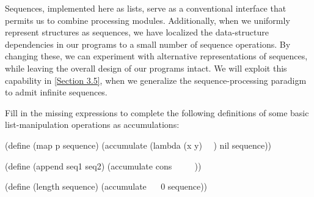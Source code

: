 Sequences, implemented here as lists, serve as a conventional interface that permits us to combine processing modules.
Additionally, when we uniformly represent structures as sequences, we have localized the data-structure dependencies in our programs to a small number of sequence operations.
By changing these, we can experiment with alternative representations of sequences, while leaving the overall design of our programs intact.
We will exploit this capability in \cref{Section 3.5}, when we generalize the sequence-processing paradigm to admit infinite sequences.



\begin{exercise}
	\label{Exercise 2.33}
	Fill in the missing expressions to complete the following definitions of some basic list-manipulation operations as accumulations:
	\begin{scheme}
	  (define (map p sequence)
	    (accumulate (lambda (x y) ~~) nil sequence))

	  (define (append seq1 seq2)
	    (accumulate cons ~~ ~~))

	  (define (length sequence)
	    (accumulate ~~ 0 sequence))
	\end{scheme}
\end{exercise}



